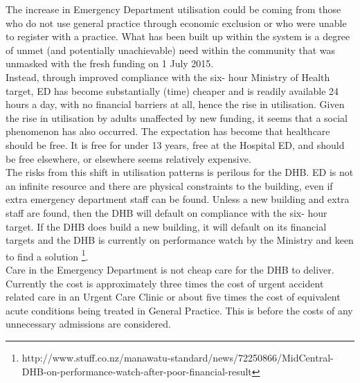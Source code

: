 \documentclass[11pt,a4paper]{article}
\begin{document}
The increase in Emergency Department utilisation could be coming from those who do not use general practice through economic exclusion or who were unable to register with a practice. What has been built up within the system is a degree of unmet (and potentially unachievable) need within the community that was unmasked with the fresh funding on 1 July 2015.\\


Instead, through improved compliance with the six- hour Ministry of Health target, ED has become substantially (time) cheaper and is readily available 24 hours a day, with no financial barriers at all, hence the rise in utilisation. Given the rise in utilisation by adults unaffected by new funding, it seems that a social phenomenon has also occurred. The expectation has become that healthcare should be free. It is free for under 13 years, free at the Hospital ED, and should be free elsewhere, or elsewhere seems relatively expensive. \\


The risks from this shift in utilisation patterns is perilous for the DHB. ED is not an infinite resource and there are physical constraints to the building, even if extra emergency department staff can be found. Unless a new building and extra staff are found, then the DHB will default on compliance with the six- hour target. If the DHB does build a new building, it will default on its financial targets and the DHB is currently on performance watch by the Ministry and keen to find a solution \footnote{http://www.stuff.co.nz/manawatu-standard/news/72250866/MidCentral-DHB-on-performance-watch-after-poor-financial-result}. \\


Care in the Emergency Department is not cheap care for the DHB to deliver. Currently the cost is approximately three times the cost of urgent accident related care in an Urgent Care Clinic or about five times the cost of equivalent acute conditions being treated in General Practice. This is before the costs of any unnecessary admissions are considered.\\
\end{document}
